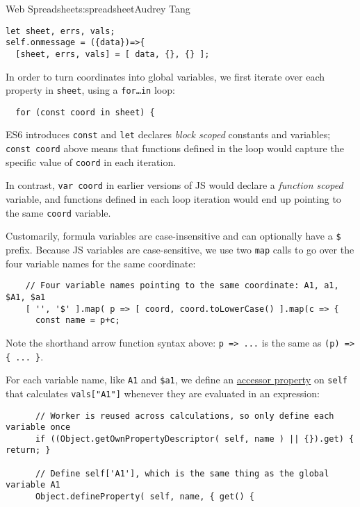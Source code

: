 \begin{aosachapter}{Web Spreadsheet}{s:spreadsheet}{Audrey Tang}
\begin{verbatim}
let sheet, errs, vals;
self.onmessage = ({data})=>{
  [sheet, errs, vals] = [ data, {}, {} ];
\end{verbatim}

In order to turn coordinates into global variables, we first iterate
over each property in \texttt{sheet}, using a \texttt{for\ldots{}in}
loop:

\begin{verbatim}
  for (const coord in sheet) {
\end{verbatim}

ES6 introduces \texttt{const} and \texttt{let} declares \emph{block
scoped} constants and variables; \texttt{const coord} above means that
functions defined in the loop would capture the specific value of
\texttt{coord} in each iteration.

In contrast, \texttt{var coord} in earlier versions of JS would declare
a \emph{function scoped} variable, and functions defined in each loop
iteration would end up pointing to the same \texttt{coord} variable.

Customarily, formula variables are case-insensitive and can optionally
have a \texttt{\$} prefix. Because JS variables are case-sensitive, we
use two \texttt{map} calls to go over the four variable names for the
same coordinate:

\begin{verbatim}
    // Four variable names pointing to the same coordinate: A1, a1, $A1, $a1
    [ '', '$' ].map( p => [ coord, coord.toLowerCase() ].map(c => {
      const name = p+c;
\end{verbatim}

Note the shorthand arrow function syntax above:
\texttt{p =\textgreater{} ...} is the same as
\texttt{(p) =\textgreater{} \{ ... \}}.

For each variable name, like \texttt{A1} and \texttt{\$a1}, we define an
\href{https://developer.mozilla.org/en-US/docs/Web/JavaScript/Reference/Global_Objects/Object/defineProperty}{accessor
property} on \texttt{self} that calculates \texttt{vals{[}"A1"{]}}
whenever they are evaluated in an expression:

\begin{verbatim}
      // Worker is reused across calculations, so only define each variable once
      if ((Object.getOwnPropertyDescriptor( self, name ) || {}).get) { return; }

      // Define self['A1'], which is the same thing as the global variable A1
      Object.defineProperty( self, name, { get() {
\end{verbatim}


\end{aosachapter}
